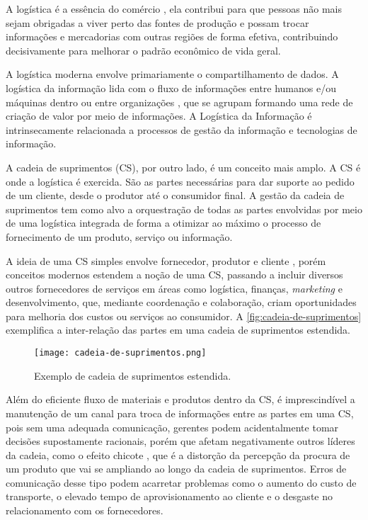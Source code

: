 	A logística é a essência do comércio \cite{ballou2006cadeiasuprimentos}, ela contribui para que pessoas não mais sejam obrigadas a viver perto das fontes de produção e possam trocar informações e mercadorias com outras regiões de forma efetiva, contribuindo decisivamente para melhorar o padrão econômico de vida geral. 
	
	A logística moderna envolve primariamente o compartilhamento de dados. A logística da informação lida com o fluxo de informações entre humanos e/ou máquinas dentro ou entre organizações \cite{haftor2009information}, que se agrupam formando uma rede de criação de valor por meio de informações. A Logística da Informação é intrinsecamente relacionada a processos de gestão da informação e tecnologias de informação.
	
	A cadeia de suprimentos (CS), por outro lado, é um conceito mais amplo. A CS é onde a logística é exercida. São as partes necessárias para dar suporte ao pedido de um cliente, desde o produtor até o consumidor final. A gestão da cadeia de suprimentos tem como alvo a orquestração de todas as partes envolvidas por meio de uma logística integrada de forma a otimizar ao máximo o processo de fornecimento de um produto, serviço ou informação.
	
	A ideia de uma CS simples envolve fornecedor, produtor e cliente \cite{hugos2018supplychain}, porém conceitos modernos estendem a noção de uma CS, passando a incluir diversos outros fornecedores de serviços em áreas como logística, finanças, \textit{marketing} e desenvolvimento, que, mediante coordenação e colaboração, criam oportunidades para melhoria dos custos ou serviços ao consumidor. A \autoref{fig:cadeia-de-suprimentos} exemplifica a inter-relação das partes em uma cadeia de suprimentos estendida.
	
	\begin{figure}[htb]
		\centering
		\caption{Exemplo de cadeia de suprimentos estendida.}
		\label{fig:cadeia-de-suprimentos}
		\texttt{[image: cadeia-de-suprimentos.png]}
	\end{figure}
	
	Além do eficiente fluxo de materiais e produtos dentro da CS, é imprescindível a manutenção de um canal para troca de informações entre as partes em uma CS, pois sem uma adequada comunicação, gerentes podem acidentalmente tomar decisões supostamente racionais, porém que afetam negativamente outros líderes da cadeia, como o efeito chicote \cite{lee1997bullwhip}, que é a distorção da percepção da procura de um produto que vai se ampliando ao longo da cadeia de suprimentos. Erros de comunicação desse tipo podem acarretar problemas como o aumento do custo de transporte, o elevado tempo de aprovisionamento ao cliente e o desgaste no relacionamento com os fornecedores.
	
